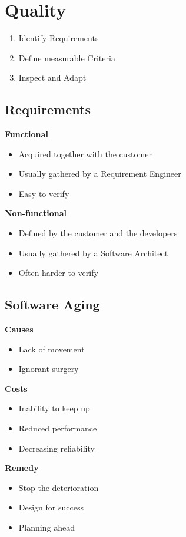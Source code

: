 
\section{Quality}
\begin{enumerate}
    \item Identify Requirements
    \item Define measurable Criteria
    \item Inspect and Adapt
\end{enumerate}

\subsection{Requirements}
\textbf{Functional}
\begin{itemize}
    \item Acquired together with the customer
    \item Usually gathered by a Requirement Engineer
    \item Easy to verify
\end{itemize}
\textbf{Non-functional}
\begin{itemize}
    \item Defined by the customer and the developers
    \item Usually gathered by a Software Architect
    \item Often harder to verify
\end{itemize}

\subsection{Software Aging}
\textbf{Causes}
\begin{itemize}
    \item Lack of movement
    \item Ignorant surgery
\end{itemize}
\textbf{Costs}
\begin{itemize}
    \item Inability to keep up
    \item Reduced performance
    \item Decreasing reliability
\end{itemize}
\textbf{Remedy}
\begin{itemize}
    \item Stop the deterioration
    \item Design for success
    \item Planning ahead
\end{itemize}

